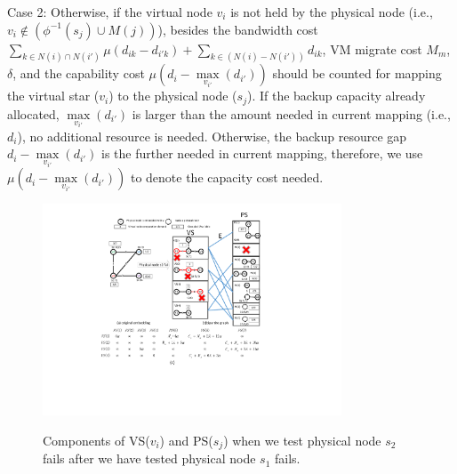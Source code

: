 Case 2: Otherwise, if the virtual node $v_i$ is not held by the physical node (i.e., ${{v_i} \notin \left( {{\phi ^{ - 1}}({s_j}) \cup M(j)} \right)}$), besides the bandwidth cost ${\sum\limits_{k \in N(i) \cap N(i')} {\mu({d_{ik}} - {d_{i'k}})}  + \sum\limits_{k \in \left( {N(i) - N(i')} \right)} {{d_{ik}}} }$, VM migrate cost ${ {M_m}}$, $\delta$, and the capability cost ${\mu({d_i} - \mathop {\max }\limits_{{v_{i'}}} \left( {{d_{i'}}} \right))}$ should be counted for mapping the virtual star ($v_i$) to the physical node ($s_j$). If the backup capacity already allocated, ${\mathop {\max }\limits_{{v_{i'}}} \left( {{d_{i'}}} \right)}$ is larger than the amount needed  in current mapping (i.e., $d_i$), no additional resource is needed. Otherwise, the backup resource gap ${{d_i} - \mathop {\max }\limits_{{v_{i'}}} \left( {{d_{i'}}} \right)}$ is the further needed in current mapping, therefore, we use  ${\mu({d_i} - \mathop {\max }\limits_{{v_{i'}}} \left( {{d_{i'}}} \right))}$ to denote the capacity cost needed.



\begin{figure}
\centering
\includegraphics[width=3.5in]{Fig/StarRepresentationNode2}\\
  \caption{Components of VS($v_i$) and PS($s_j$) when we test physical node $s_2$  fails after we have tested physical node $s_1$ fails.}\label{fig:StarRepresentationNode2}
\end{figure}


